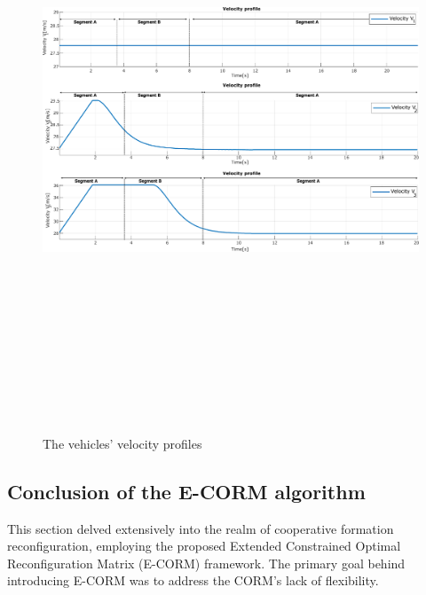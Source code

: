         \begin{figure}[!h]
        \centering 
        \includegraphics[width=12cm,height=18cm,keepaspectratio]{chapters/Chapitre_5/Figures/E-CORM/Velocity_profiles.pdf}
        \caption{The vehicles' velocity profiles}
        \label{fig:E-CORM: velocity}
        \end{figure}



\newpage
\subsection{Conclusion of the E-CORM algorithm} \label{sec:Conclusion_E-CORM}








This section delved extensively into the realm of cooperative formation reconfiguration, employing the proposed Extended Constrained Optimal Reconfiguration Matrix (E-CORM) framework. The primary goal behind introducing E-CORM was to address the CORM's lack of flexibility. 

